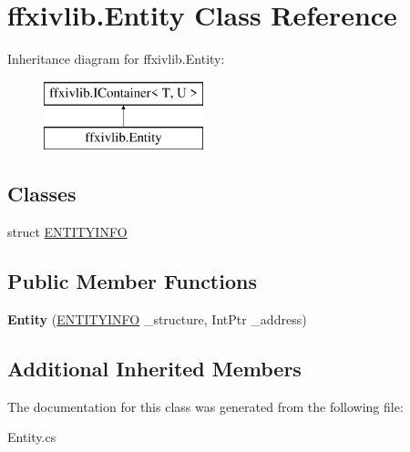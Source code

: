 \hypertarget{classffxivlib_1_1_entity}{\section{ffxivlib.\-Entity Class Reference}
\label{classffxivlib_1_1_entity}
}
Inheritance diagram for ffxivlib.\-Entity\-:\begin{figure}[H]
\begin{center}
\leavevmode
\includegraphics[height=2.000000cm]{classffxivlib_1_1_entity}
\end{center}
\end{figure}
\subsection*{Classes}
\begin{DoxyCompactItemize}
\item 
struct \hyperlink{structffxivlib_1_1_entity_1_1_e_n_t_i_t_y_i_n_f_o}{E\-N\-T\-I\-T\-Y\-I\-N\-F\-O}
\end{DoxyCompactItemize}
\subsection*{Public Member Functions}
\begin{DoxyCompactItemize}
\item 
\hypertarget{classffxivlib_1_1_entity_ad8f9917fb98bf79a98427972aae4a0f5}{{\bfseries Entity} (\hyperlink{structffxivlib_1_1_entity_1_1_e_n_t_i_t_y_i_n_f_o}{E\-N\-T\-I\-T\-Y\-I\-N\-F\-O} \-\_\-structure, Int\-Ptr \-\_\-address)}\label{classffxivlib_1_1_entity_ad8f9917fb98bf79a98427972aae4a0f5}

\end{DoxyCompactItemize}
\subsection*{Additional Inherited Members}


The documentation for this class was generated from the following file\-:\begin{DoxyCompactItemize}
\item 
Entity.\-cs\end{DoxyCompactItemize}
